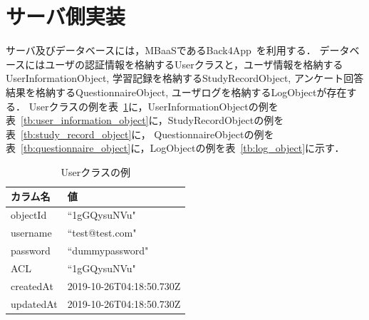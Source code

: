 \section{サーバ側実装}
サーバ及びデータベースには，MBaaSであるBack4App~\cite{back4app}を利用する．
データベースにはユーザの認証情報を格納するUserクラスと，ユーザ情報を格納するUserInformationObject, 学習記録を格納するStudyRecordObject, アンケート回答結果を格納するQuestionnaireObject, ユーザログを格納するLogObjectが存在する．
Userクラスの例を表~\ref{tb:user_class}に，UserInformationObjectの例を表~\ref{tb:user_information_object}に，StudyRecordObjectの例を表~\ref{tb:study_record_object}に，
QuestionnaireObjectの例を表~\ref{tb:questionnaire_object}に，LogObjectの例を表~\ref{tb:log_object}に示す．

\begin{table}[htb]
\begin{center}
  \begin{tabular}{|l|l|} \hline
    カラム名 & 値 \\ \hline
    objectId & ``1gGQysuNVu" \\
    username & ``test@test.com" \\
    password & ``dummypassword" \\
    ACL & ``1gGQysuNVu" \\
	createdAt & 2019-10-26T04:18:50.730Z \\
	updatedAt & 2019-10-26T04:18:50.730Z \\ \hline
  \end{tabular}
  \caption{Userクラスの例}
  \label{tb:user_class}
\end{center}
\end{table}

